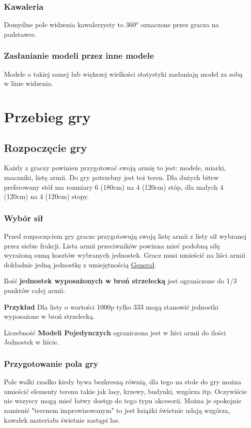 \subsubsection{Kawaleria}
Domyślne pole widzenia kawalerzysty to \ang{360} oznaczone przez gracza na podstawce. 

\subsubsection{Zasłanianie modeli przez inne modele}
Modele o takiej samej lub większej wielkości statystyki zasłaniają model za sobą w linie widzenia. 

\section{Przebieg gry}

\subsection{Rozpoczęcie gry}
Każdy z graczy powinien przygotować swoją armię to jest: modele, miarki, znaczniki, listę armii. Do gry potrzebny jest też teren. Dla dużych bitew preferowany stół ma rozmiary 6 (180cm) na 4 (120cm) stóp, dla małych 4 (120cm) na 4 (120cm) stopy. 

\subsubsection{Wybór sił}

Przed rozpoczęciem gry gracze przygotowują swoją listę armii z listy sił wybranej przez siebie frakcji. Lista armii przeciwników powinna mieć podobną siłę wyrażoną sumą kosztów wybranych jednostek. Gracz musi umieścić na liści armii dokładnie jedną jednostkę z umiejętnością \hyperref[sec:link_uw_general]{Generał}.

Ilość \textbf{jednostek wyposażonych w broń strzelecką} jest ograniczone do 1/3 punktów całej armii. 

\textbf{Przykład} Dla listy o wartości 1000p tylko 333 mogą stanowić jednostki wyposażone w broń strzelecką.   

Liczebność \textbf{Modeli Pojedynczych} ograniczona jest w liści armii do ilości Jednostek w liście. 

\subsubsection{Przygotowanie pola gry}
Pole walki rzadko kiedy bywa bezkresną równią, dla tego na stole do gry można umieścić elementy terenu takie jak lasy, krzewy, budynki, wzgórza itp. Oczywiście nie wszyscy mogą mieć łatwy dostęp do tego typu akcesorii. Można je spokojnie zamienić "terenem improwizowanym" to jest książki świetnie udają wzgórza, kawałek materiału świetnie zastąpi las.

